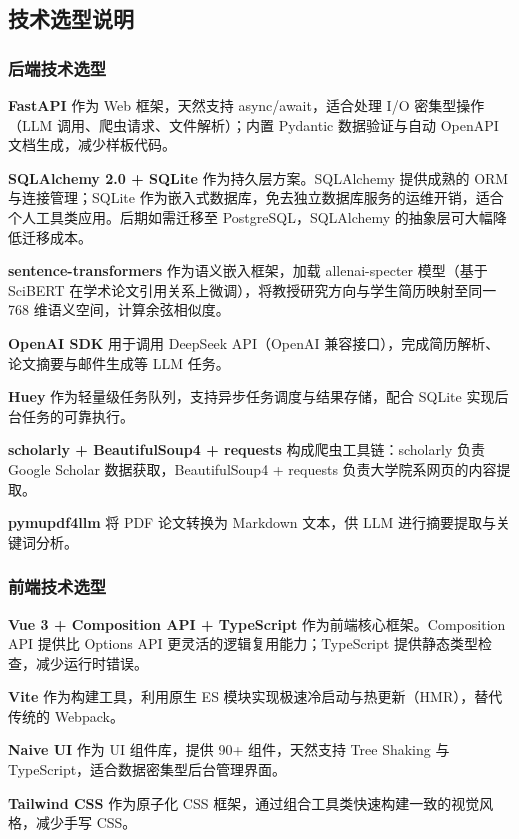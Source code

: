 \documentclass[11pt]{article}
\begin{document}
\subsection{技术选型说明}

\subsubsection{后端技术选型}

\textbf{FastAPI} 作为 Web 框架，天然支持 async/await，适合处理 I/O 密集型操作（LLM 调用、爬虫请求、文件解析）；内置 Pydantic 数据验证与自动 OpenAPI 文档生成，减少样板代码。

\textbf{SQLAlchemy 2.0 + SQLite} 作为持久层方案。SQLAlchemy 提供成熟的 ORM 与连接管理；SQLite 作为嵌入式数据库，免去独立数据库服务的运维开销，适合个人工具类应用。后期如需迁移至 PostgreSQL，SQLAlchemy 的抽象层可大幅降低迁移成本。

\textbf{sentence-transformers} 作为语义嵌入框架，加载 allenai-specter 模型（基于 SciBERT 在学术论文引用关系上微调），将教授研究方向与学生简历映射至同一 768 维语义空间，计算余弦相似度。

\textbf{OpenAI SDK} 用于调用 DeepSeek API（OpenAI 兼容接口），完成简历解析、论文摘要与邮件生成等 LLM 任务。

\textbf{Huey} 作为轻量级任务队列，支持异步任务调度与结果存储，配合 SQLite 实现后台任务的可靠执行。

\textbf{scholarly + BeautifulSoup4 + requests} 构成爬虫工具链：scholarly 负责 Google Scholar 数据获取，BeautifulSoup4 + requests 负责大学院系网页的内容提取。

\textbf{pymupdf4llm} 将 PDF 论文转换为 Markdown 文本，供 LLM 进行摘要提取与关键词分析。

\subsubsection{前端技术选型}

\textbf{Vue 3 + Composition API + TypeScript} 作为前端核心框架。Composition API 提供比 Options API 更灵活的逻辑复用能力；TypeScript 提供静态类型检查，减少运行时错误。

\textbf{Vite} 作为构建工具，利用原生 ES 模块实现极速冷启动与热更新（HMR），替代传统的 Webpack。

\textbf{Naive UI} 作为 UI 组件库，提供 90+ 组件，天然支持 Tree Shaking 与 TypeScript，适合数据密集型后台管理界面。

\textbf{Tailwind CSS} 作为原子化 CSS 框架，通过组合工具类快速构建一致的视觉风格，减少手写 CSS。
\end{document}
